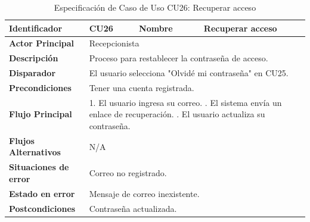 \begingroup
\setlength{\parskip}{0pt}
\begin{longtable}{|p{3.5cm}|p{2cm}|p{2.5cm}|p{7cm}|}
\caption{Especificación de Caso de Uso CU26: Recuperar acceso}
\label{tab:cu26} \\
\hline
\textbf{Identificador} & CU26 & \textbf{Nombre} & Recuperar acceso \\ \hline
\textbf{Actor Principal} & \multicolumn{3}{p{11.5cm}|}{Recepcionista} \\ \hline
\textbf{Descripción} & \multicolumn{3}{p{11.5cm}|}{Proceso para restablecer la contraseña de acceso.} \\ \hline
\textbf{Disparador} & \multicolumn{3}{p{11.5cm}|}{El usuario selecciona "Olvidé mi contraseña" en CU25.} \\ \hline
\textbf{Precondiciones} & \multicolumn{3}{p{11.5cm}|}{Tener una cuenta registrada.} \\ \hline
\textbf{Flujo Principal} & \multicolumn{3}{p{11.5cm}|}{1. El usuario ingresa su correo. \newline 2. El sistema envía un enlace de recuperación. \newline 3. El usuario actualiza su contraseña.} \\ \hline
\textbf{Flujos Alternativos} & \multicolumn{3}{p{11.5cm}|}{N/A} \\ \hline
\textbf{Situaciones de error} & \multicolumn{3}{p{11.5cm}|}{Correo no registrado.} \\ \hline
\textbf{Estado en error} & \multicolumn{3}{p{11.5cm}|}{Mensaje de correo inexistente.} \\ \hline
\textbf{Postcondiciones} & \multicolumn{3}{p{11.5cm}|}{Contraseña actualizada.} \\ \hline
\end{longtable}
\endgroup

\vspace{0.8cm}

